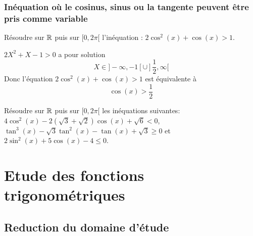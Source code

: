 \documentclass[a4paper, 11pt]{article}
\begin{document}
%

\subsubsection{In\'equation o\`{u} le cosinus, sinus ou la tangente peuvent \^{e}tre pris comme variable}


\begin{exemple}
R\'esoudre sur $\mathbb{R}$ puis sur $\lbrack 0,2\pi\lbrack$ l'in\'equation : $2\cos^2 (x) + \cos (x) > 1$. 

\end{exemple}
\begin{cor}
$2X^2+X-1>0 $ a pour solution 
$$X\in ]-\infty , -1[ \cup ]\frac{1}{2},\infty[$$
Donc l'équation $2\cos^2 (x) + \cos (x) > 1$  est équivalente à 
$$\cos(x) >\frac{1}{2}$$

\end{cor}


{\footnotesize
\begin{exo} R\'esoudre sur $\mathbb{R}$ puis sur $\lbrack 0,2\pi\lbrack$ les in\'equations suivantes: $4\cos^2{(x)}-2(\sqrt{3}+\sqrt{2})\cos{(x)}+\sqrt{6}<0$, $\tan^3{(x)}-\sqrt{3}\tan^2{(x)}-\tan{(x)}+\sqrt{3}\geq 0$ et $2\sin^2{(x)}+5\cos{(x)}-4\leq 0$.
\end{exo}}
\vspace{0.3cm}

%
%
%
%




\section{Etude des fonctions trigonométriques}

\subsection{Reduction du domaine d'étude}
\end{document}
